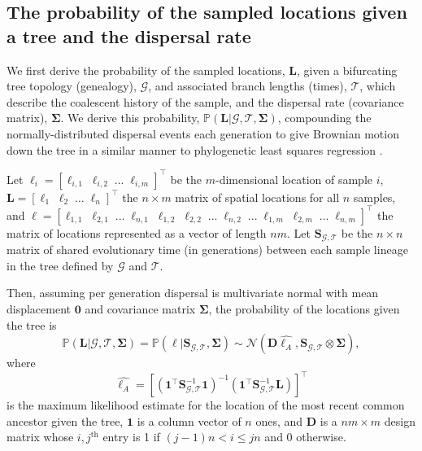 \documentclass[12pt]{article}
\begin{document}
\subsection*{The probability of the sampled locations given a tree and the dispersal rate}

We first derive the probability of the sampled locations, $\mathbf{L}$, given a bifurcating tree topology (genealogy), $\mathcal{G}$, and associated branch lengths (times), $\mathcal{T}$, which describe the coalescent history of the sample, and the dispersal rate (covariance matrix), $\mathbf{\Sigma}$. 
We derive this probability, $\mathbb{P}(\mathbf{L} | \mathcal{G},\mathcal{T},\mathbf{\Sigma})$, compounding the normally-distributed dispersal events each generation to give Brownian motion down the tree in a similar manner to phylogenetic least squares regression \citep{grafen1989phylogenetic,harmon2019phylogenetic}.

Let $\bm{\ell}_i = [\ell_{i,1} \; \ell_{i,2} \; ... \;\ell_{i,m}]^\intercal$ be the $m$-dimensional location of sample $i$, $\mathbf{L} = [\bm{\ell}_1\; \bm{\ell}_2\; \dots \; \bm{\ell}_n]^\intercal$ the $n\times m$ matrix of spatial locations for all $n$ samples, and $\bm{\ell} = [\ell_{1,1} \; \ell_{2,1} \; ... \; \ell_{n,1} \; \ell_{1,2} \; \ell_{2,2} \; ... \; \ell_{n,2} \; ... \; \ell_{1,m} \; \ell_{2,m} \; ... \; \ell_{n,m}]^\intercal$ the matrix of locations represented as a vector of length $nm$.
Let $\mathbf{S}_{\mathcal{G},\mathcal{T}}$ be the $n\times n$ matrix of shared evolutionary time (in generations) between each sample lineage in the tree defined by $\mathcal{G}$ and $\mathcal{T}$.

Then, assuming per generation dispersal is multivariate normal with mean displacement $\mathbf{0}$ and covariance matrix $\mathbf{\Sigma}$, the probability of the locations given the tree is
%
\begin{equation}\label{eq:PS}
\mathbb{P}(\mathbf{L} | \mathcal{G},\mathcal{T}, \mathbf{\Sigma}) = \mathbb{P}(\bm{\ell} | \mathbf{S}_{\mathcal{G},\mathcal{T}}, \mathbf{\Sigma}) \sim \mathcal{N}\left(\mathbf{D} \widehat{\bm{\ell}_A}, \mathbf{S}_{\mathcal{G},\mathcal{T}} \otimes \mathbf{\Sigma} \right),
\end{equation}
%
where
%
\begin{equation}\label{eq:sa}
\widehat{\bm{\ell}_A} = [(\mathbf{1}^\intercal \mathbf{S}_{\mathcal{G},\mathcal{T}}^{-1} \mathbf{1})^{-1}(\mathbf{1}^\intercal \mathbf{S}_{\mathcal{G},\mathcal{T}}^{-1} \mathbf{L})]^\intercal
\end{equation}
%
is the maximum likelihood estimate for the location of the most recent common ancestor given the tree, $\mathbf{1}$ is a column vector of $n$ ones, and $\mathbf{D}$ is a $nm\times m$ design matrix whose $i,j^\mathrm{th}$ entry is 1 if $(j-1) n < i \leq j n$ and 0 otherwise.
\end{document}
